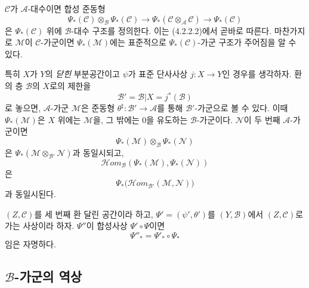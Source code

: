 \begin{env}[4.2.4]
\label{0.4.2.4-ko}
$\mathcal C$가 $\mathcal A$-대수이면 합성 준동형
\[
  \Psi_*(\mathcal C)\otimes_{\mathcal B}\Psi_*(\mathcal C)
  \longrightarrow
  \Psi_*(\mathcal C\otimes_{\mathcal A}\mathcal C)
  \longrightarrow
  \Psi_*(\mathcal C)
\]
은 $\Psi_*(\mathcal C)$ 위에 $\mathcal B$-대수 구조를 정의한다.
이는 (4.2.2.2)에서 곧바로 따른다. 마찬가지로 $\mathcal M$이
$\mathcal C$-가군이면 $\Psi_*(\mathcal M)$에는 표준적으로
$\Psi_*(\mathcal C)$-가군 구조가 주어짐을 알 수 있다.
\end{env}

\begin{env}[4.2.5]
\label{0.4.2.5-ko}
특히 $X$가 $Y$의 \emph{닫힌} 부분공간이고 $\psi$가 표준 단사사상
$j:X\to Y$인 경우를 생각하자. 환의 층 $\mathcal B$의 $X$로의 제한을
\[
  \mathcal B'=\mathcal B|X=j^*(\mathcal B)
\]
로 놓으면, $\mathcal A$-가군 $\mathcal M$은 준동형
$\theta^\sharp:\mathcal B'\to\mathcal A$를 통해
$\mathcal B'$-가군으로 볼 수 있다. 이때 $\Psi_*(\mathcal M)$은
$X$ 위에는 $\mathcal M$을, 그 밖에는 $0$을 유도하는
$\mathcal B$-가군이다. $\mathcal N$이 두 번째 $\mathcal A$-가군이면
\[
  \Psi_*(\mathcal M)\otimes_{\mathcal B}\Psi_*(\mathcal N)
\]
은 $\Psi_*(\mathcal M\otimes_{\mathcal B'}\mathcal N)$과 동일시되고,
\[
  \mathcal H\!om_{\mathcal B}
    (\Psi_*(\mathcal M),\Psi_*(\mathcal N))
\]
은
\[
  \Psi_*\bigl(
    \mathcal H\!om_{\mathcal B'}(\mathcal M,\mathcal N)\bigr)
\]
과 동일시된다.
\end{env}

\begin{env}[4.2.6]
\label{0.4.2.6-ko}
$(Z,\mathcal C)$를 세 번째 환 달린 공간이라 하고,
$\Psi'=(\psi',\theta')$를 $(Y,\mathcal B)$에서
$(Z,\mathcal C)$로 가는 사상이라 하자. $\Psi''$이 합성사상
$\Psi'\circ\Psi$이면
\[
  \Psi''_*=\Psi'_*\circ\Psi_*
\]
임은 자명하다.
\end{env}

\subsection{$\mathcal B$-가군의 역상}
\label{subsection:0.4.3-ko}

